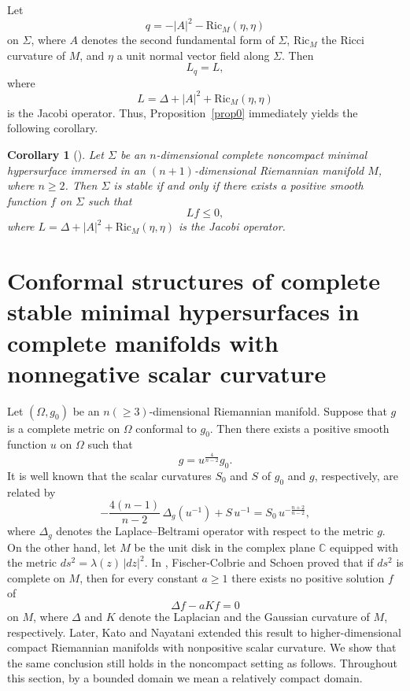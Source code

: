 \documentclass[amssymb,amstex,amsmath,11pt]{article}
\numberwithin{equation}{section}
\theoremstyle{plain}
\newtheorem{cor}[thm]{Corollary}
\theoremstyle{definition}
\theoremstyle{remark}
\newcommand{\lap}{\Delta}
\def\Ric{\textrm{Ric}}
\begin{document}
\noindent Let
$$
q=-|A|^2-\Ric_M(\eta,\eta)
$$
on $\Sigma$, where $A$ denotes the second fundamental form of $\Sigma$, $\Ric_M$ the Ricci curvature of $M$, and $\eta$ a unit normal vector field along $\Sigma$. Then
$$
L_q=L,
$$
where
$$
L=\Delta+|A|^2+\Ric_M(\eta,\eta)
$$
is the Jacobi operator. Thus, Proposition~\ref{prop0} immediately yields the following corollary.

\begin{cor}[\cite{FC&S80}]\label{fc&s}
Let $\Sigma$ be an $n$-dimensional complete noncompact minimal hypersurface immersed in an $(n+1)$-dimensional Riemannian manifold $M$, where $n\geq 2$. Then $\Sigma$ is stable if and only if there exists a positive smooth function $f$ on $\Sigma$ such that
$$
Lf \leq 0,
$$
where $L = \lap + |A|^2 + \mathrm{Ric}_M(\eta,\eta)$ is the Jacobi operator.
\end{cor}







\section{Conformal structures of complete stable minimal hypersurfaces in complete manifolds with nonnegative scalar curvature} \label{sec3}
 

Let $(\Omega,g_0)$ be an $n(\ge 3)$-dimensional Riemannian manifold. Suppose that $g$ is a complete metric on $\Omega$ conformal to $g_0$. Then there exists a positive smooth function $u$ on $\Omega$ such that
$$
g=u^{\frac{4}{n-2}}g_0.
$$
It is well known that the scalar curvatures $S_0$ and $S$ of $g_0$ and $g$, respectively, are related by
\begin{equation}\label{ye}
-\frac{4(n-1)}{n-2}\,\Delta_g(u^{-1})+S\,u^{-1}
=
S_0\,u^{-\frac{n+2}{n-2}},
\end{equation}
where $\Delta_g$ denotes the Laplace--Beltrami operator with respect to the metric $g$. On the other hand, let $M$ be the unit disk in the complex plane $\mathbb{C}$ equipped with the metric $ds^2=\lambda(z)\,|dz|^2$. In \cite{FC&S80}, Fischer-Colbrie and Schoen proved that if $ds^2$ is complete on $M$, then for every constant $a\ge 1$ there exists no positive solution $f$ of
$$
\Delta f-aKf=0
$$
on $M$, where $\Delta$ and $K$ denote the Laplacian and the Gaussian curvature of $M$, respectively. Later, Kato and Nayatani \cite{KN93} extended this result to higher-dimensional compact Riemannian manifolds with nonpositive scalar curvature. We show that the same conclusion still holds in the noncompact setting as follows. Throughout this section, by a bounded domain we mean a relatively compact domain.
\end{document}
